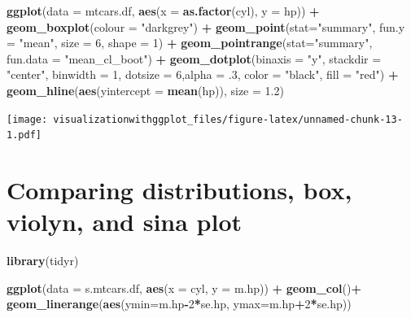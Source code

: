 \documentclass[]{krantz}
\makeatletter
\newenvironment{Shaded}{\begin{snugshade}}{\end{snugshade}}
\newcommand{\KeywordTok}[1]{\textcolor[rgb]{0.13,0.29,0.53}{\textbf{#1}}}
\newcommand{\DataTypeTok}[1]{\textcolor[rgb]{0.13,0.29,0.53}{#1}}
\newcommand{\DecValTok}[1]{\textcolor[rgb]{0.00,0.00,0.81}{#1}}
\newcommand{\FloatTok}[1]{\textcolor[rgb]{0.00,0.00,0.81}{#1}}
\newcommand{\StringTok}[1]{\textcolor[rgb]{0.31,0.60,0.02}{#1}}
\newcommand{\OperatorTok}[1]{\textcolor[rgb]{0.81,0.36,0.00}{\textbf{#1}}}
\newcommand{\NormalTok}[1]{#1}
\newenvironment{kframe}{%
\medskip{}
\setlength{\fboxsep}{.8em}
 \def\at@end@of@kframe{}%
 \ifinner\ifhmode%
  \def\at@end@of@kframe{\end{minipage}}%
  \begin{minipage}{\columnwidth}%
 \fi\fi%
 \def\FrameCommand##1{\hskip\@totalleftmargin \hskip-\fboxsep
 \colorbox{shadecolor}{##1}\hskip-\fboxsep
     \hskip-\linewidth \hskip-\@totalleftmargin \hskip\columnwidth}%
 \MakeFramed {\advance\hsize-\width
   \@totalleftmargin\z@ \linewidth\hsize
   \@setminipage}}%
 {\par\unskip\endMakeFramed%
 \at@end@of@kframe}
\renewenvironment{Shaded}{\begin{kframe}}{\end{kframe}}
\theoremstyle{definition}
\theoremstyle{definition}
\theoremstyle{definition}
\theoremstyle{remark}
\makeatother
\begin{document}
\begin{Shaded}
\begin{Highlighting}[]
\KeywordTok{ggplot}\NormalTok{(}\DataTypeTok{data =}\NormalTok{ mtcars.df, }\KeywordTok{aes}\NormalTok{(}\DataTypeTok{x =} \KeywordTok{as.factor}\NormalTok{(cyl), }\DataTypeTok{y =}\NormalTok{ hp)) }\OperatorTok{+}\StringTok{ }
\StringTok{  }\KeywordTok{geom_boxplot}\NormalTok{(}\DataTypeTok{colour =} \StringTok{"darkgrey"}\NormalTok{) }\OperatorTok{+}\StringTok{ }
\StringTok{  }\KeywordTok{geom_point}\NormalTok{(}\DataTypeTok{stat=}\StringTok{"summary"}\NormalTok{, }\DataTypeTok{fun.y =} \StringTok{"mean"}\NormalTok{, }\DataTypeTok{size =} \DecValTok{6}\NormalTok{, }\DataTypeTok{shape =} \DecValTok{1}\NormalTok{) }\OperatorTok{+}
\StringTok{  }\KeywordTok{geom_pointrange}\NormalTok{(}\DataTypeTok{stat=}\StringTok{"summary"}\NormalTok{, }\DataTypeTok{fun.data =} \StringTok{"mean_cl_boot"}\NormalTok{) }\OperatorTok{+}
\StringTok{  }\KeywordTok{geom_dotplot}\NormalTok{(}\DataTypeTok{binaxis =} \StringTok{"y"}\NormalTok{, }\DataTypeTok{stackdir =} \StringTok{"center"}\NormalTok{, }\DataTypeTok{binwidth =} \DecValTok{1}\NormalTok{, }
               \DataTypeTok{dotsize =} \DecValTok{6}\NormalTok{,}\DataTypeTok{alpha =}\NormalTok{ .}\DecValTok{3}\NormalTok{, }\DataTypeTok{color =} \StringTok{"black"}\NormalTok{, }\DataTypeTok{fill =} \StringTok{"red"}\NormalTok{) }\OperatorTok{+}
\StringTok{  }\KeywordTok{geom_hline}\NormalTok{(}\KeywordTok{aes}\NormalTok{(}\DataTypeTok{yintercept =} \KeywordTok{mean}\NormalTok{(hp)), }\DataTypeTok{size =} \FloatTok{1.2}\NormalTok{) }
\end{Highlighting}
\end{Shaded}

\texttt{[image: visualizationwithggplot\_files/figure-latex/unnamed-chunk-13-1.pdf]}

\section{Comparing distributions, box, violyn, and sina
plot}\label{comparing-distributions-box-violyn-and-sina-plot}

\begin{Shaded}
\begin{Highlighting}[]
\KeywordTok{library}\NormalTok{(tidyr)}

\KeywordTok{ggplot}\NormalTok{(}\DataTypeTok{data =}\NormalTok{ s.mtcars.df, }\KeywordTok{aes}\NormalTok{(}\DataTypeTok{x =}\NormalTok{ cyl, }\DataTypeTok{y =}\NormalTok{ m.hp)) }\OperatorTok{+}
\StringTok{  }\KeywordTok{geom_col}\NormalTok{()}\OperatorTok{+}
\StringTok{  }\KeywordTok{geom_linerange}\NormalTok{(}\KeywordTok{aes}\NormalTok{(}\DataTypeTok{ymin=}\NormalTok{m.hp}\OperatorTok{-}\DecValTok{2}\OperatorTok{*}\NormalTok{se.hp, }\DataTypeTok{ymax=}\NormalTok{m.hp}\OperatorTok{+}\DecValTok{2}\OperatorTok{*}\NormalTok{se.hp))}
\end{Highlighting}
\end{Shaded}
\end{document}
